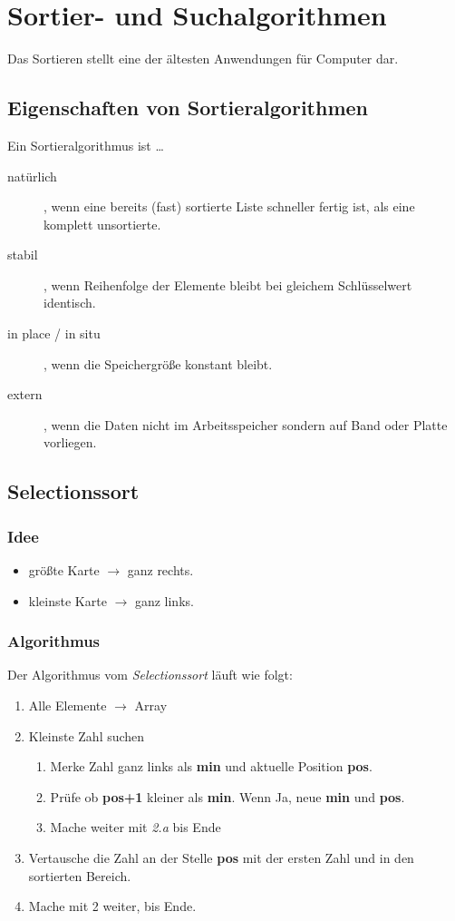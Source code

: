 \documentclass{book}
\begin{document}
\chapter{Sortier- und Suchalgorithmen}
Das Sortieren stellt eine der ältesten Anwendungen für Computer dar. 

\section{Eigenschaften von Sortieralgorithmen}
Ein Sortieralgorithmus ist …
\begin{description}
	\item[natürlich], wenn eine bereits (fast) sortierte Liste schneller fertig ist, als eine komplett unsortierte.
	\item[stabil], wenn Reihenfolge der Elemente bleibt bei gleichem Schlüsselwert identisch.
	\item[in place / in situ], wenn die Speichergröße konstant bleibt.
	\item[extern], wenn die Daten nicht im Arbeitsspeicher sondern auf Band oder Platte vorliegen. 
\end{description}

\section{Selectionssort}
\subsection{Idee}
\begin{itemize}
	\item größte Karte $\rightarrow$ ganz rechts.
	\item kleinste Karte $\rightarrow$ ganz links.
\end{itemize}
\subsection{Algorithmus}
Der Algorithmus vom \textit{Selectionssort} läuft wie folgt:
\begin{enumerate}
	\item Alle Elemente $\rightarrow$ Array
	\item Kleinste Zahl suchen
	\begin{enumerate}
		\item Merke Zahl ganz links als \textbf{min} und aktuelle Position \textbf{pos}.
		\item Prüfe ob \textbf{pos+1} kleiner als \textbf{min}. Wenn Ja, neue \textbf{min} und \textbf{pos}.
		\item Mache weiter mit \textit{2.a} bis Ende
	\end{enumerate}
	\item Vertausche die Zahl an der Stelle \textbf{pos} mit der ersten Zahl und in den sortierten Bereich.
	\item Mache mit 2 weiter, bis Ende.
\end{enumerate}
\end{document}

